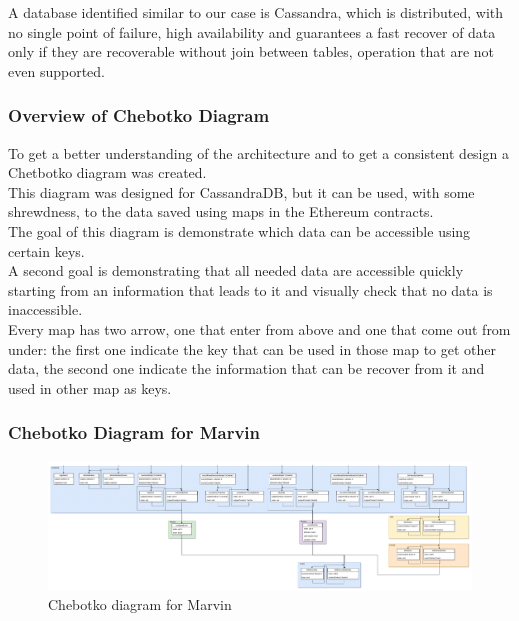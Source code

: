 \documentclass[ManualeSviluppatore.tex]{subfiles}
\begin{document}
A database identified similar to our case is Cassandra, which is distributed, with no single point of failure, high availability and guarantees a fast recover of data only if they are recoverable without join between tables, operation that are not even supported.\\

\subsubsection{Overview of Chebotko Diagram}
To get a better understanding of the architecture and to get a consistent design a Chetbotko diagram was created.\\
This diagram was designed for CassandraDB, but it can be used, with some shrewdness, to the data saved using maps in the Ethereum contracts.\\
The goal of this diagram is demonstrate which data can be accessible using certain keys.\\
A second goal is demonstrating that all needed data are accessible quickly starting from an information that leads to it and visually check that no data is inaccessible.\\
Every map has two arrow, one that enter from above and one that come out from under: the first one indicate the key that can be used in those map to get other data, the second one indicate the information that can be recover from it and used in other map as keys.\\

\begin{landscape}
\newpage
\subsubsection{Chebotko Diagram for Marvin}
\begin{figure}[h]
	\centering
	\includegraphics[width=1\linewidth]{"diagrammi/Chebotko Diagram"}
	\caption{Chebotko diagram for Marvin}
	\label{fig:Chebotko diagram for Marvin}
\end{figure}
\end{landscape}
\newpage
\end{document}
